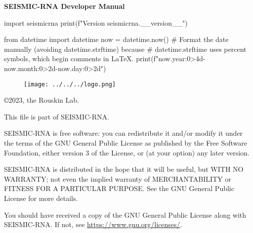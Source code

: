 \documentclass[main.tex]{subfiles}
\begin{document}
\begin{titlepage}


\begin{center}

\huge
\textbf{SEISMIC-RNA Developer Manual}
\normalsize

\vspace{0.5cm}

\Large
\begin{python}
import seismicrna
print(f"Version {seismicrna.__version__}")
\end{python}
\normalsize

\vspace{0.25cm}

\Large
\begin{python}
from datetime import datetime
now = datetime.now()
# Format the date manually (avoiding datetime.strftime) because
# datetime.strftime uses percent symbols, which begin comments in LaTeX.
print(f"{now.year:0>4d}-{now.month:0>2d}-{now.day:0>2d}")
\end{python}
\normalsize

\end{center}

\vspace{2cm}

\begin{figure}[h]
    \texttt{[image: ../../../logo.png]}
\end{figure}


\end{titlepage}


\pagebreak



\noindent
\copyright 2023, the Rouskin Lab.

\vspace{0.5cm}

\noindent
This file is part of SEISMIC-RNA.

\vspace{0.25cm}

\noindent
SEISMIC-RNA is free software: you can redistribute it and/or modify it
under the terms of the GNU General Public License as published by the
Free Software Foundation, either version 3 of the License, or (at your
option) any later version.

\vspace{0.25cm}

\noindent
SEISMIC-RNA is distributed in the hope that it will be useful, but WITH
NO WARRANTY; not even the implied warranty of MERCHANTABILITY or FITNESS
FOR A PARTICULAR PURPOSE. See the GNU General Public License for more
details.

\vspace{0.25cm}

\noindent
You should have received a copy of the GNU General Public License along
with SEISMIC-RNA. If not, see \url{https://www.gnu.org/licenses/}.


\pagebreak
\end{document}
